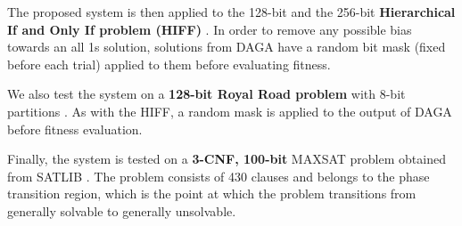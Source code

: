 \documentclass[runningheads,a4paper]{llncs}
\begin{document}

The proposed system is then applied to the 128-bit and the 256-bit \textbf{Hierarchical If and Only If problem (HIFF)} \cite{watson1999hierarchically}. In order to remove any possible bias towards an all 1s solution, solutions from DAGA have a random bit mask (fixed before each trial) applied to them before evaluating fitness.

We also test the system on a \textbf{128-bit Royal Road problem} with 8-bit partitions \cite{mitchell1992royal}. As with the HIFF, a random mask is applied to the output of DAGA before fitness evaluation.

Finally, the system is tested on a \textbf{3-CNF, 100-bit} MAXSAT problem obtained from SATLIB \cite{hoos2000satllb}. The problem consists of 430 clauses and belongs to the phase transition region, which is the point at which the problem transitions from generally solvable to generally unsolvable. 

\end{document}
